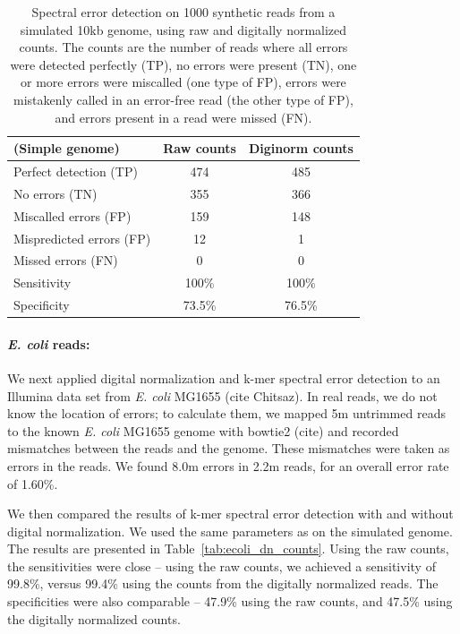 \documentclass{article}
\begin{document}

\begin{table}
\begin{tabular}{|l|c|c|}
\hline
(Simple genome) & Raw counts & Diginorm counts \\
\hline
Perfect detection (TP) & 474 & 485 \\
No errors (TN) & 355 & 366 \\
Miscalled errors (FP) & 159 & 148 \\
Mispredicted errors (FP) & 12 & 1 \\
Missed errors (FN) & 0 & 0 \\
\hline
Sensitivity & 100\% & 100\% \\
Specificity & 73.5\% & 76.5\% \\
\hline
\end{tabular}

\caption{Spectral error detection on 1000 synthetic reads from a
  simulated 10kb genome, using raw and digitally normalized
  counts.  The counts are the number of reads where all errors were
  detected perfectly (TP), no errors were present (TN), one or more errors were miscalled (one type of FP), errors were mistakenly called in an error-free read (the other type of FP), and errors present in a read were missed (FN). }
\label{tab:a}
\end{table}


\paragraph{{\em E. coli} reads:}
We next applied digital normalization and k-mer spectral error
detection to an Illumina data set from {\em E. coli} MG1655 (cite
Chitsaz).  In real reads, we do not know the location of errors; to
calculate them, we mapped 5m untrimmed reads to the known {\em
  E. coli} MG1655 genome with bowtie2 (cite) and recorded mismatches
between the reads and the genome.  These mismatches were taken as
errors in the reads.  We found 8.0m errors in 2.2m reads, for an
overall error rate of 1.60\%.

We then compared the results of k-mer spectral error detection with
and without digital normalization.  We used the same parameters as on
the simulated genome.  The results are presented in
Table~\ref{tab:ecoli_dn_counts}. Using the raw counts, the
sensitivities were close -- using the raw counts, we achieved a
sensitivity of 99.8\%, versus 99.4\% using the counts from the
digitally normalized reads.  The specificities were also comparable --
47.9\% using the raw counts, and 47.5\% using the digitally normalized
counts.
\end{document}
